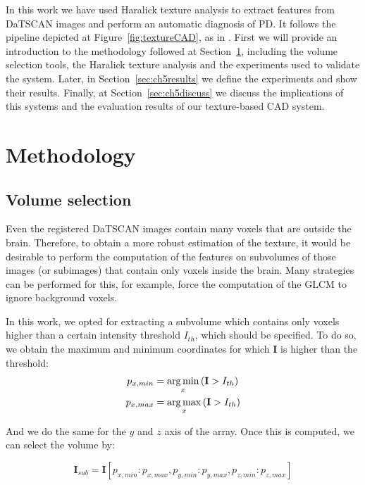 In this work we have used Haralick texture analysis to extract features from DaTSCAN images and perform an automatic diagnosis of \ac{PD}. It follows the pipeline depicted at Figure~\ref{fig:textureCAD}, as in \cite{Martinez-Murcia2013266,martinez2014parametrization}. First we will provide an introduction to the methodology followed at Section~\ref{sec:methodsCh5}, including the volume selection tools, the Haralick texture analysis and the experiments used to validate the system. Later, in Section~\ref{sec:ch5results} we define the experiments and show their results. Finally, at Section~\ref{sec:ch5discuss} we discuss the implications of this systems and the evaluation results of our texture-based \ac{CAD} system.

\section{Methodology}\label{sec:methodsCh5}

\subsection{Volume selection}\label{sec:volume}
Even the registered DaTSCAN images contain many voxels that are outside the brain. Therefore, to obtain a more robust estimation of the texture, it would be desirable to perform the computation of the features on subvolumes of those images (or subimages) that contain only voxels inside the brain. Many strategies can be performed for this, for example, force the computation of the \ac{GLCM} to ignore background voxels. 

In this work, we opted for extracting a subvolume which contains only voxels higher than a certain intensity threshold $I_{th}$, which should be specified. To do so, we obtain the maximum and minimum coordinates for which $\mathbf{I}$ is higher than the threshold: 
\begin{align}
	p_{x,min} & = \operatorname*{arg\,min}_x \left( \mathbf{I} > I_{th} \right)\\
	p_{x,max} & = \operatorname*{arg\,max}_x \left( \mathbf{I} > I_{th} \right)
\end{align}

And we do the same for the $y$ and $z$ axis of the array. Once this is computed, we can select the volume by: 

\begin{equation}
	\mathbf{I}_{sub} = \mathbf{I}[p_{x,min}:p_{x,max}, p_{y,min}:p_{y,max}, p_{z,min}:p_{z,max}]
\end{equation}

